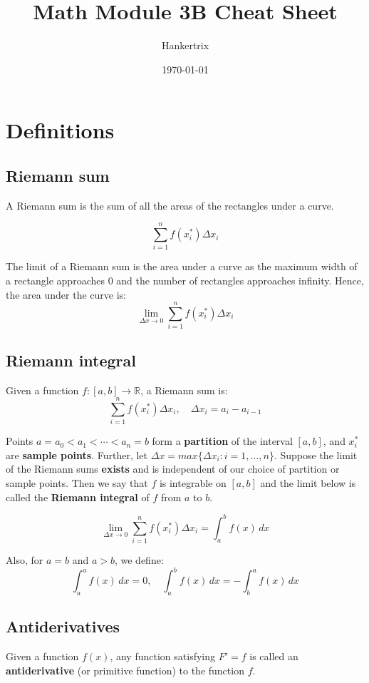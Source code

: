 \documentclass[11pt]{article}
\author{Hankertrix}
\date{\today}
\title{Math Module 3B Cheat Sheet}
\begin{document}
\maketitle
\setcounter{tocdepth}{2}
\tableofcontents

\newpage

\section{Definitions}
\label{sec:org7f9e693}

\subsection{Riemann sum}
\label{sec:orgb02a6f6}
A Riemann sum is the sum of all the areas of the rectangles under a curve.

\[\sum_{i = 1}^n f(x_{i}^*) \Delta x_i\]

The limit of a Riemann sum is the area under a curve as the maximum width of a rectangle approaches 0 and the number of rectangles approaches infinity. Hence, the area under the curve is:
\[\lim_{\Delta x \rightarrow 0} \sum_{i = 1}^n f(x_i^*) \Delta x_i\]

\subsection{Riemann integral}
\label{sec:org5307820}
Given a function \(f : [a, b] \rightarrow \mathbb{R}\), a Riemann sum is:
\[\sum_{i = 1}^n f(x_i^*) \Delta x_i, \quad \Delta x_i = a_i - a_{i - 1}\]

Points \(a = a_0 < a_1 < \cdots < a_n = b\) form a \textbf{partition} of the interval \([a, b]\), and \(x_i^*\) are \textbf{sample points}. Further, let \(\Delta x = max\{\Delta x_i : i = 1, \ldots, n\}\). Suppose the limit of the Riemann sums \textbf{exists} and is independent of our choice of partition or sample points. Then we say that \(f\) is integrable on \([a, b]\) and the limit below is called the \textbf{Riemann integral} of \(f\) from \(a\) to \(b\).

\[\lim_{\Delta x \rightarrow 0} \sum_{i = 1}^n f(x_i^*) \Delta x_i = \int_a^b f(x) \, dx\]

Also, for \(a = b\) and \(a > b\), we define:
\[\int_a^a f(x) \, dx = 0, \quad \int_a^b f(x) \, dx = - \int_b^a f(x) \, dx\]

\newpage

\subsection{Antiderivatives}
\label{sec:orgd49ca6c}
Given a function \(f(x)\), any function satisfying \(F' = f\) is called an \textbf{antiderivative} (or primitive function) to the function \(f\).
\\[0pt]
\end{document}
